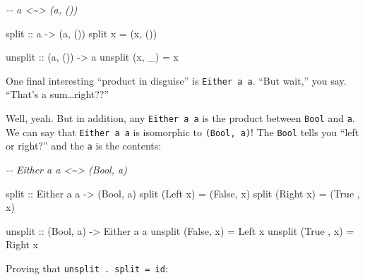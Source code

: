 \documentclass[]{article}
\newenvironment{Shaded}{}{}
\newcommand{\CommentTok}[1]{\textcolor[rgb]{0.38,0.63,0.69}{\textit{#1}}}
\newcommand{\DataTypeTok}[1]{\textcolor[rgb]{0.56,0.13,0.00}{#1}}
\newcommand{\NormalTok}[1]{#1}
\newcommand{\OtherTok}[1]{\textcolor[rgb]{0.00,0.44,0.13}{#1}}
\begin{document}
\begin{Shaded}
\begin{Highlighting}[]
\CommentTok{{-}{-} a <\textasciitilde{}> (a, ())}

\OtherTok{split ::}\NormalTok{ a }\OtherTok{{-}>}\NormalTok{ (a, ())}
\NormalTok{split x }\OtherTok{=}\NormalTok{ (x, ())}

\OtherTok{unsplit ::}\NormalTok{ (a, ()) }\OtherTok{{-}>}\NormalTok{ a}
\NormalTok{unsplit (x, \_) }\OtherTok{=}\NormalTok{ x}
\end{Highlighting}
\end{Shaded}

One final interesting ``product in disguise'' is \texttt{Either\ a\ a}. ``But
wait,'' you say. ``That's a sum\ldots right??''

Well, yeah. But in addition, any \texttt{Either\ a\ a} is the product between
\texttt{Bool} and \texttt{a}. We can say that \texttt{Either\ a\ a} is
isomorphic to \texttt{(Bool,\ a)}! The \texttt{Bool} tells you ``left or
right?'' and the \texttt{a} is the contents:

\begin{Shaded}
\begin{Highlighting}[]
\CommentTok{{-}{-} Either a a <\textasciitilde{}> (Bool, a)}

\OtherTok{split ::} \DataTypeTok{Either}\NormalTok{ a a }\OtherTok{{-}>}\NormalTok{ (}\DataTypeTok{Bool}\NormalTok{, a)}
\NormalTok{split (}\DataTypeTok{Left}\NormalTok{  x) }\OtherTok{=}\NormalTok{ (}\DataTypeTok{False}\NormalTok{, x)}
\NormalTok{split (}\DataTypeTok{Right}\NormalTok{ x) }\OtherTok{=}\NormalTok{ (}\DataTypeTok{True}\NormalTok{ , x)}

\OtherTok{unsplit ::}\NormalTok{ (}\DataTypeTok{Bool}\NormalTok{, a) }\OtherTok{{-}>} \DataTypeTok{Either}\NormalTok{ a a}
\NormalTok{unsplit (}\DataTypeTok{False}\NormalTok{, x) }\OtherTok{=} \DataTypeTok{Left}\NormalTok{  x}
\NormalTok{unsplit (}\DataTypeTok{True}\NormalTok{ , x) }\OtherTok{=} \DataTypeTok{Right}\NormalTok{ x}
\end{Highlighting}
\end{Shaded}

Proving that \texttt{unsplit\ .\ split\ =\ id}:
\end{document}
